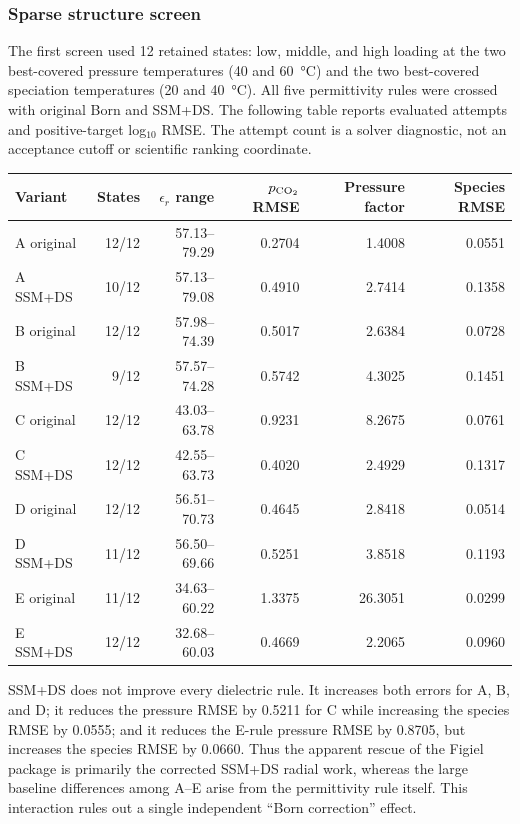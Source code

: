 \documentclass[10pt,oneside]{scrartcl}
\begin{document}
\subsubsection{Sparse structure screen}

The first screen used 12 retained states: low, middle, and high loading at the
two best-covered pressure temperatures (40 and \SI{60}{\celsius}) and the two
best-covered speciation temperatures (20 and \SI{40}{\celsius}). All five
permittivity rules were crossed with original Born and SSM+DS. The following table reports
evaluated attempts and positive-target log$_{10}$ RMSE. The attempt count is
a solver diagnostic, not an acceptance cutoff or scientific ranking
coordinate.

\begin{center}
\small
\begin{tabular}{@{}lrrrrr@{}}
\toprule
Variant & States & $\epsilon_r$ range & $p_{\ce{CO2}}$ RMSE & Pressure factor & Species RMSE \\
\midrule
A original & 12/12 & 57.13--79.29 & 0.2704 & 1.4008 & 0.0551 \\
A SSM+DS & 10/12 & 57.13--79.08 & 0.4910 & 2.7414 & 0.1358 \\
B original & 12/12 & 57.98--74.39 & 0.5017 & 2.6384 & 0.0728 \\
B SSM+DS & 9/12 & 57.57--74.28 & 0.5742 & 4.3025 & 0.1451 \\
C original & 12/12 & 43.03--63.78 & 0.9231 & 8.2675 & 0.0761 \\
C SSM+DS & 12/12 & 42.55--63.73 & 0.4020 & 2.4929 & 0.1317 \\
D original & 12/12 & 56.51--70.73 & 0.4645 & 2.8418 & 0.0514 \\
D SSM+DS & 11/12 & 56.50--69.66 & 0.5251 & 3.8518 & 0.1193 \\
E original & 11/12 & 34.63--60.22 & 1.3375 & 26.3051 & 0.0299 \\
E SSM+DS & 12/12 & 32.68--60.03 & 0.4669 & 2.2065 & 0.0960 \\
\bottomrule
\end{tabular}
\end{center}

SSM+DS does not improve every dielectric rule. It increases both errors for
A, B, and D; it reduces the pressure RMSE by 0.5211 for C
while increasing the species RMSE by 0.0555; and it reduces the E-rule pressure
RMSE by 0.8705, but increases the species
RMSE by 0.0660. Thus the apparent rescue of the Figiel package is primarily
the corrected SSM+DS radial work, whereas the large baseline differences among
A--E arise from the permittivity rule itself. This interaction rules out a
single independent ``Born correction'' effect.
\end{document}
